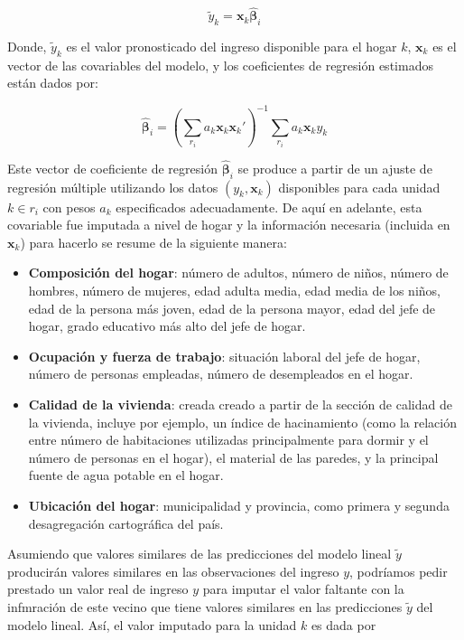 \[\tilde{y}_k = \mathbf{x}_k \hat{\boldsymbol{\beta}}_i\]

Donde, \(\tilde{y}_k\) es el valor pronosticado del ingreso disponible para el hogar \(k\), \(\mathbf{x}_k\) es el vector de las covariables del modelo, y los coeficientes de regresión estimados están dados por:

\[
\hat{\boldsymbol{\beta}}_i = (\sum_{r_i} a_k\mathbf{x}_k\mathbf{x}_k')^{-1}
\sum_{r_i} a_k\mathbf{x}_ky_k
\]

Este vector de coeficiente de regresión \(\hat{\boldsymbol{\beta}}_i\) se produce a partir de un ajuste de regresión múltiple utilizando los datos \((y_k, \mathbf{x}_k)\) disponibles para cada unidad \(k \in r_i\) con pesos \(a_k\) especificados adecuadamente. De aquí en adelante, esta covariable fue imputada a nivel de hogar y la información necesaria (incluida en \(\mathbf{x}_k\)) para hacerlo se resume de la siguiente manera:

\begin{itemize}
\tightlist
\item
  \textbf{Composición del hogar}: número de adultos, número de niños, número de hombres, número de mujeres, edad adulta media, edad media de los niños, edad de la persona más joven, edad de la persona mayor, edad del jefe de hogar, grado educativo más alto del jefe de hogar.
\item
  \textbf{Ocupación y fuerza de trabajo}: situación laboral del jefe de hogar, número de personas empleadas, número de desempleados en el hogar.
\item
  \textbf{Calidad de la vivienda}: creada creado a partir de la sección de calidad de la vivienda, incluye por ejemplo, un índice de hacinamiento (como la relación entre número de habitaciones utilizadas principalmente para dormir y el número de personas en el hogar), el material de las paredes, y la principal fuente de agua potable en el hogar.
\item
  \textbf{Ubicación del hogar}: municipalidad y provincia, como primera y segunda desagregación cartográfica del país.
\end{itemize}

Asumiendo que valores similares de las predicciones del modelo lineal \(\tilde y\) producirán valores similares en las observaciones del ingreso \(y\), podríamos pedir prestado un valor real de ingreso \(y\) para imputar el valor faltante con la infmración de este vecino que tiene valores similares en las predicciones \(\tilde y\) del modelo lineal. Así, el valor imputado para la unidad \(k\) es dada por

